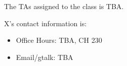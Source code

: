 The TAs assigned to the class is TBA. 


X's contact information is:
\begin{itemize}
\item Office Hours: TBA, CH 230
\item Email/gtalk: TBA 
\end{itemize}
